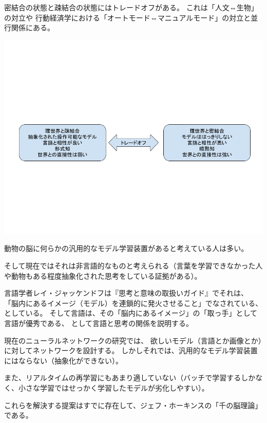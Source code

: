 \documentclass[12pt, unicode]{beamer}
\begin{document}
\begin{frame}

密結合の状態と疎結合の状態にはトレードオフがある。
これは「人文⇔生物」の対立や
行動経済学における「オートモード⇔マニュアルモード」の対立と並行関係にある。

\vspace{-2\baselineskip}
\centering
\includegraphics[keepaspectratio, scale=0.3]{open_umwelt.png}

\end{frame}

\begin{frame}

動物の脳に何らかの汎用的なモデル学習装置があると考えている人は多い。

そして現在ではそれは非言語的なものと考えられる（言葉を学習できなかった人や動物もある程度抽象化された思考をしている証拠がある）。

言語学者レイ・ジャッケンドフは『思考と意味の取扱いガイド』でそれは、
「脳内にあるイメージ（モデル）を連鎖的に発火させること」でなされている、としている。
そして言語は、その「脳内にあるイメージ」の「取っ手」として言語が優秀である、
として言語と思考の関係を説明する。

\end{frame}

\begin{frame}

現在のニューラルネットワークの研究では、
欲しいモデル（言語とか画像とか）に対してネットワークを設計する。
しかしそれでは、汎用的なモデル学習装置にはならない（抽象化ができない）。

また、リアルタイムの再学習にもあまり適していない（バッチで学習するしかなく、小さな学習ではせっかく学習したモデルが劣化しやすい）。

これらを解決する提案はすでに存在して、ジェフ・ホーキンスの「千の脳理論」である。

\end{frame}
\end{document}
